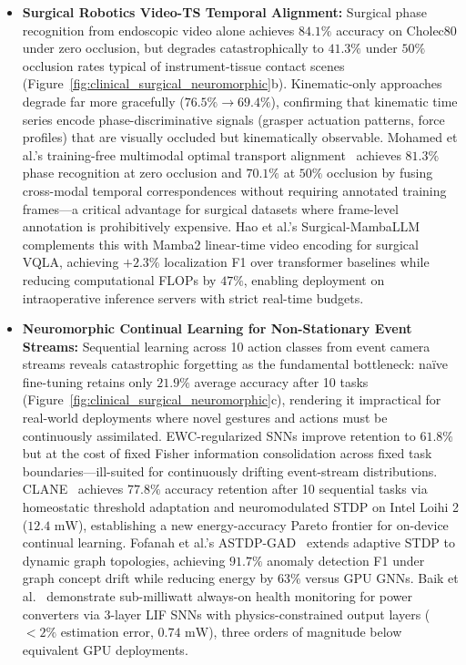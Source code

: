 \begin{itemize}
    \item \textbf{Surgical Robotics Video-TS Temporal Alignment:} Surgical phase recognition from endoscopic video alone achieves $84.1\%$ accuracy on Cholec80 under zero occlusion, but degrades catastrophically to $41.3\%$ under $50\%$ occlusion rates typical of instrument-tissue contact scenes (Figure~\ref{fig:clinical_surgical_neuromorphic}b). Kinematic-only approaches degrade far more gracefully ($76.5\% \to 69.4\%$), confirming that kinematic time series encode phase-discriminative signals (grasper actuation patterns, force profiles) that are visually occluded but kinematically observable. Mohamed et al.'s training-free multimodal optimal transport alignment~\cite{Mohamed2026SurgOT} achieves $81.3\%$ phase recognition at zero occlusion and $70.1\%$ at $50\%$ occlusion by fusing cross-modal temporal correspondences without requiring annotated training frames---a critical advantage for surgical datasets where frame-level annotation is prohibitively expensive. Hao et al.'s Surgical-MambaLLM~\cite{Hao2025SurgicalMambaLLM} complements this with Mamba2 linear-time video encoding for surgical VQLA, achieving $+2.3\%$ localization F1 over transformer baselines while reducing computational FLOPs by $47\%$, enabling deployment on intraoperative inference servers with strict real-time budgets.

    \item \textbf{Neuromorphic Continual Learning for Non-Stationary Event Streams:} Sequential learning across 10 action classes from event camera streams reveals catastrophic forgetting as the fundamental bottleneck: na\"{i}ve fine-tuning retains only $21.9\%$ average accuracy after 10 tasks (Figure~\ref{fig:clinical_surgical_neuromorphic}c), rendering it impractical for real-world deployments where novel gestures and actions must be continuously assimilated. EWC-regularized SNNs improve retention to $61.8\%$ but at the cost of fixed Fisher information consolidation across fixed task boundaries---ill-suited for continuously drifting event-stream distributions. CLANE~\cite{Hajizada2026CLANE} achieves $77.8\%$ accuracy retention after 10 sequential tasks via homeostatic threshold adaptation and neuromodulated STDP on Intel Loihi 2 ($12.4\text{ mW}$), establishing a new energy-accuracy Pareto frontier for on-device continual learning. Fofanah et al.'s ASTDP-GAD~\cite{Fofanah2026ASTDPGAD} extends adaptive STDP to dynamic graph topologies, achieving $91.7\%$ anomaly detection F1 under graph concept drift while reducing energy by $63\%$ versus GPU GNNs. Baik et al.~\cite{Baik2026NeuromorphicPowerConverter} demonstrate sub-milliwatt always-on health monitoring for power converters via 3-layer LIF SNNs with physics-constrained output layers ($<\!2\%$ estimation error, $0.74\text{ mW}$), three orders of magnitude below equivalent GPU deployments.
\end{itemize}

